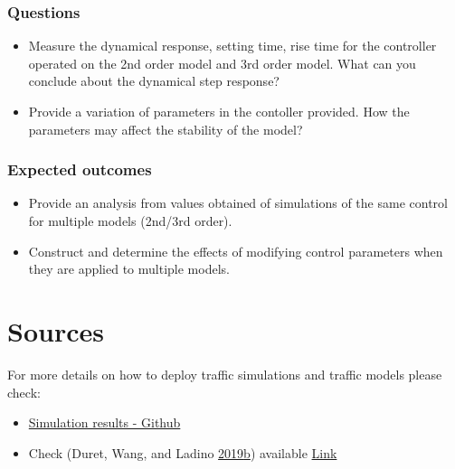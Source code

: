 \documentclass[]{book}
\providecommand{\tightlist}{%
  \setlength{\itemsep}{0pt}\setlength{\parskip}{0pt}}
\theoremstyle{definition}
\theoremstyle{definition}
\theoremstyle{definition}
\theoremstyle{remark}
\begin{document}
\hypertarget{questions-7}{%
\subsubsection*{Questions}\label{questions-7}}

\begin{itemize}
\tightlist
\item
  Measure the dynamical response, setting time, rise time for the
  controller operated on the 2nd order model and 3rd order model. What
  can you conclude about the dynamical step response?
\item
  Provide a variation of parameters in the contoller provided. How the
  parameters may affect the stability of the model?
\end{itemize}

\hypertarget{expected-outcomes-7}{%
\subsubsection*{Expected outcomes}\label{expected-outcomes-7}}

\begin{itemize}
\tightlist
\item
  Provide an analysis from values obtained of simulations of the same
  control for multiple models (2nd/3rd order).
\item
  Construct and determine the effects of modifying control parameters
  when they are applied to multiple models.
\end{itemize}

\hypertarget{sources-1}{%
\section*{Sources}\label{sources-1}}

For more details on how to deploy traffic simulations and traffic models
please check:

\begin{itemize}
\item
  \href{https://github.com/research-licit/Hierarchical-Platooning/blob/dev/Operational/platoon-closed-3rd.py}{Simulation
  results - Github}
\item
  Check (Duret, Wang, and Ladino
  \protect\hyperlink{ref-Duret2019}{2019}\protect\hyperlink{ref-Duret2019}{b})
  available \href{http://bit.ly/Hierarchical_ISTTT}{Link}
\end{itemize}
\end{document}
